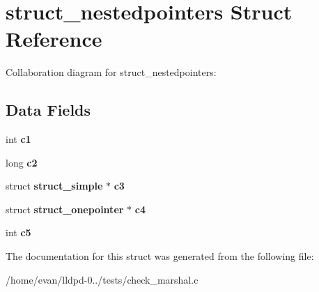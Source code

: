 \section{struct\-\_\-nestedpointers \-Struct \-Reference}
\label{structstruct__nestedpointers}


\-Collaboration diagram for struct\-\_\-nestedpointers\-:
\subsection*{\-Data \-Fields}
\begin{DoxyCompactItemize}
\item 
int {\bfseries c1}\label{structstruct__nestedpointers_a7e14c1f8a9ffaa9d4a89828706d25998}

\item 
long {\bfseries c2}\label{structstruct__nestedpointers_aa2d9fcf922c55ce39b4dc2a702ae18d7}

\item 
struct {\bf struct\-\_\-simple} $\ast$ {\bfseries c3}\label{structstruct__nestedpointers_add0f147819763a94d1dfd65449661b64}

\item 
struct {\bf struct\-\_\-onepointer} $\ast$ {\bfseries c4}\label{structstruct__nestedpointers_a25fdbd0390bd39d49e79b399f95a902b}

\item 
int {\bfseries c5}\label{structstruct__nestedpointers_aee63f77d7c4b046d2b549aef7e80893e}

\end{DoxyCompactItemize}


\-The documentation for this struct was generated from the following file\-:\begin{DoxyCompactItemize}
\item 
/home/evan/lldpd-\/0../tests/check\-\_\-marshal.\-c\end{DoxyCompactItemize}
